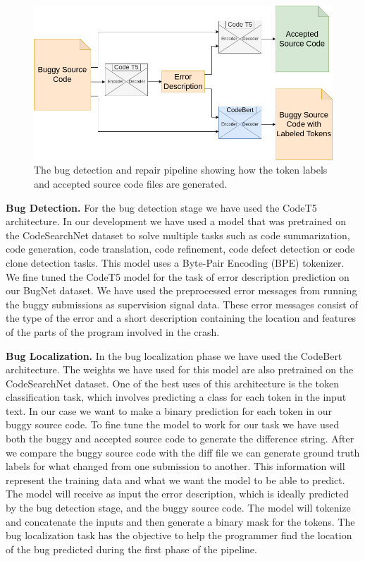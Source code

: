 \documentclass[12pt,a4paper]{report}
\begin{document}
\begin{appendices}
\begin{figure}[H]
\centering
\includegraphics[width=\textwidth]{pics/bug-model.png}
  \caption{The bug detection and repair pipeline showing how the token labels and accepted source code files are generated.}
  \label{fig:solution1}
\end{figure}

\textbf{Bug Detection.} For the bug detection stage we have used the CodeT5 architecture. In our development we have used a model that was pretrained on the CodeSearchNet dataset to solve multiple tasks such as code summarization, code generation, code translation, code refinement, code defect detection or code clone detection tasks. This model uses a Byte-Pair Encoding (BPE) tokenizer. We fine tuned the CodeT5 model for the task of error description prediction on our BugNet dataset. We have used the preprocessed error messages from running the buggy submissions as supervision signal data. These error messages consist of the type of the error and a short description containing the location and features of the parts of the program involved in the crash.

\textbf{Bug Localization.} In the bug localization phase we have used the CodeBert architecture. The weights we have used for this model are also pretrained on the CodeSearchNet dataset. One of the best uses of this architecture is the token classification task, which involves predicting a class for each token in the input text. In our case we want to make a binary prediction for each token in our buggy source code. To fine tune the model to work for our task we have used both the buggy and accepted source code to generate the difference string. After we compare the buggy source code with the diff file we can generate ground truth labels for what changed from one submission to another. This information will represent the training data and what we want the model to be able to predict. The model will receive as input the error description, which is ideally predicted by the bug detection stage, and the buggy source code. The model will tokenize and concatenate the inputs and then generate a binary mask for the tokens. The bug localization task has the objective to help the programmer find the location of the bug predicted during the first phase of the pipeline.


\end{appendices}
\end{document}
